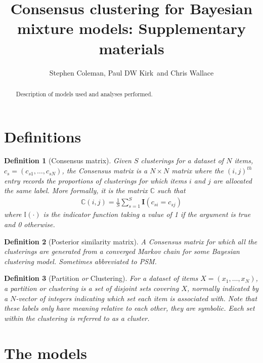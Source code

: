 \documentclass[]{article}
\title{Consensus clustering for Bayesian mixture models: Supplementary materials}
\author{Stephen Coleman, Paul DW Kirk\, and Chris Wallace}
\newtheorem{definition}{Definition}
\begin{document}
\maketitle

\begin{abstract}
Description of models used and analyses performed.
\end{abstract}


\section{Definitions}
\begin{definition}[Consensus matrix]
	Given $S$ clusterings for a dataset of $N$ items, $c_s=(c_{s1}, \ldots, c_{sN})$, the \emph{Consensus matrix} is a $N \times N$ matrix where the $(i, j )^{th}$ entry records the proportions of clusterings for which items $i$ and $j$ are allocated the same label. More formally, it is the matrix $\mathbb{C}$ such that
	\begin{align}
		\mathbb{C}(i, j) = \frac{1}{S} \sum_{s=1}^S \mathbf{I}(c_{si} = c_{sj})
	\end{align}
	where $\mathbb{I}(\cdot)$ is the indicator function taking a value of 1 if the argument is true and 0 otherwise.
\end{definition}

\begin{definition}[Posterior similarity matrix]
	A \emph{Consensus matrix} for which all the clusterings are generated from a converged Markov chain for some Bayesian clustering model. Sometimes abbreviated to \emph{PSM}.
\end{definition}

\begin{definition}[Partition \emph{or} Clustering]
	For a dataset of items $X=(x_1, \ldots, x_N)$, a \emph{partition} or \emph{clustering} is a set of disjoint sets covering $X$, normally indicated by a $N$-vector of integers indicating which set each item is associated with. Note that these labels only have meaning relative to each other, they are symbolic. Each set within the clustering is referred to as a \emph{cluster}.
\end{definition}

\section{The models} \label{sec:models}
\end{document}

